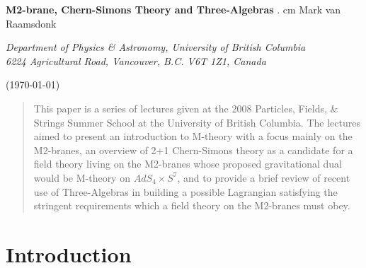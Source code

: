 \documentclass[12pt]{article}
\begin{document}
\begin{titlepage}
\begin{center}

 \vskip 1.5cm

{\Large \bf M2-brane, Chern-Simons Theory and Three-Algebras }
. cm
  { Mark van Raamsdonk}

\vskip 0.5cm

{\it Department of Physics \& Astronomy, University of British Columbia\\
6224 Agricultural Road, Vancouver, B.C. V6T 1Z1, Canada }

\end{center}

\centerline{(\today) }
\vskip 1cm
\vspace{1.0cm plus 0.5cm minus 0.5cm}

\begin{abstract}
This paper is a series of lectures given at the 2008 Particles, Fields, $\&$ Strings Summer School at the University of British Columbia.
The lectures aimed to present an introduction to M-theory with a focus mainly on the M2-branes, 
an overview of 2+1 Chern-Simons theory as a candidate for a field theory living on the M2-branes whose proposed gravitational dual would be M-theory on $AdS_4 \times S^7$, 
and to provide a brief review of recent use of Three-Algebras in building a possible Lagrangian satisfying the stringent 
requirements which a field theory on the M2-branes must obey.
\end{abstract}

\end{titlepage}

\newpage


\section{Introduction}
\end{document}
